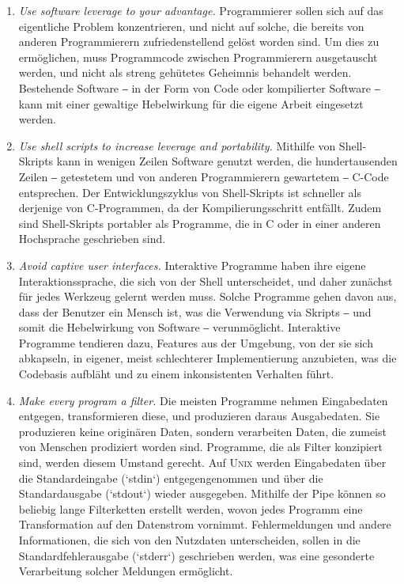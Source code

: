 \begin{enumerate}
    \item \textit{Use software leverage to your advantage.} Programmierer sollen sich auf das eigentliche Problem konzentrieren, und nicht auf solche, die bereits von anderen Programmierern zufriedenstellend gelöst worden sind. Um dies zu ermöglichen, muss Programmcode zwischen Programmierern ausgetauscht werden, und nicht als streng gehütetes Geheimnis behandelt werden. Bestehende Software ‒ in der Form von Code oder kompilierter Software ‒ kann mit einer gewaltige Hebelwirkung für die eigene Arbeit eingesetzt werden.
    \item \textit{Use shell scripts to increase leverage and portability.} Mithilfe von Shell-Skripts kann in wenigen Zeilen Software genutzt werden, die hundertausenden Zeilen ‒ getestetem und von anderen Programmierern gewartetem ‒ C-Code entsprechen. Der Entwicklungszyklus von Shell-Skripts ist schneller als derjenige von C-Programmen, da der Kompilierungsschritt entfällt. Zudem sind Shell-Skripts portabler als Programme, die in C oder in einer anderen Hochsprache geschrieben sind.
    \item \textit{Avoid captive user interfaces.} Interaktive Programme haben ihre eigene Interaktionssprache, die sich von der Shell unterscheidet, und daher zunächst für jedes Werkzeug gelernt werden muss. Solche Programme gehen davon aus, dass der Benutzer ein Mensch ist, was die Verwendung via Skripts ‒ und somit die Hebelwirkung von Software ‒ verunmöglicht. Interaktive Programme tendieren dazu, Features aus der Umgebung, von der sie sich abkapseln, in eigener, meist schlechterer Implementierung anzubieten, was die Codebasis aufbläht und zu einem inkonsistenten Verhalten führt.
    \item \textit{Make every program a filter.} Die meisten Programme nehmen Eingabedaten entgegen, transformieren diese, und produzieren daraus Ausgabedaten. Sie produzieren keine originären Daten, sondern verarbeiten Daten, die zumeist von Menschen prodiziert worden sind. Programme, die als Filter konzipiert sind, werden diesem Umstand gerecht. Auf \textsc{Unix} werden Eingabedaten über die Standardeingabe (`stdin`) entgegengenommen und über die Standardausgabe (`stdout`) wieder ausgegeben. Mithilfe der Pipe können so beliebig lange Filterketten erstellt werden, wovon jedes Programm eine Transformation auf den Datenstrom vornimmt. Fehlermeldungen und andere Informationen, die sich von den Nutzdaten unterscheiden, sollen in die Standardfehlerausgabe (`stderr`) geschrieben werden, was eine gesonderte Verarbeitung solcher Meldungen ermöglicht.
\end{enumerate}

